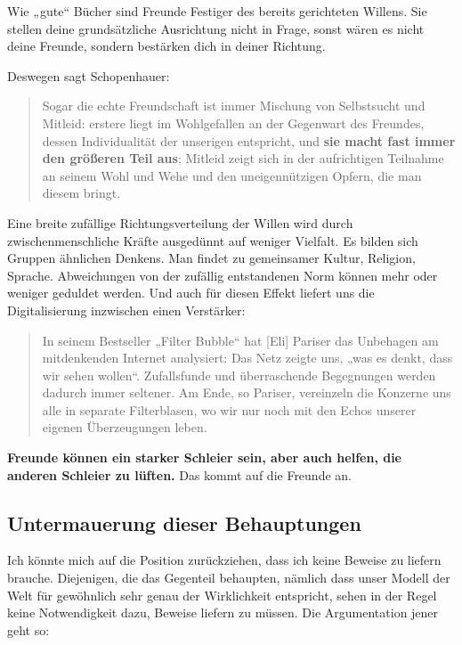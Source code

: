 \documentclass[12pt]{book}
\begin{document}
Wie „gute“ Bücher sind Freunde Festiger des bereits gerichteten Willens. Sie stellen deine grundsätzliche Ausrichtung nicht in Frage, sonst wären es nicht deine Freunde, sondern bestärken dich in deiner Richtung. 

Deswegen sagt Schopenhauer:

\begin{quote}\begin{tcolorbox}
Sogar die echte Freundschaft ist immer Mischung von Selbstsucht und Mitleid: erstere liegt im Wohlgefallen an der Gegenwart des Freundes, dessen Individualität der unserigen entspricht, und \textbf{sie macht fast immer den größeren Teil aus}; Mitleid zeigt sich in der aufrichtigen Teilnahme an seinem Wohl und Wehe und den uneigennützigen Opfern, die man diesem bringt.
\end{tcolorbox}\end{quote}

Eine breite zufällige Richtungsverteilung der Willen wird durch zwischenmenschliche Kräfte ausgedünnt auf weniger Vielfalt. Es bilden sich Gruppen ähnlichen Denkens. Man findet zu gemeinsamer Kultur, Religion, Sprache. Abweichungen von der zufällig entstandenen Norm können mehr oder weniger geduldet werden.
Und auch für diesen Effekt liefert uns die Digitalisierung inzwischen einen Verstärker:

\begin{quote}\begin{tcolorbox}
In seinem Bestseller „Filter Bubble“ hat [Eli] Pariser das Unbehagen am mitdenkenden Internet analysiert: Das Netz zeigte uns, „was es denkt, dass wir sehen wollen“. Zufallsfunde und überraschende Begegnungen werden dadurch immer seltener. Am Ende, so Pariser, vereinzeln die Konzerne uns alle in separate Filterblasen, wo wir nur noch mit den Echos unserer eigenen Überzeugungen leben.
\end{tcolorbox}\end{quote}

\textbf{Freunde können ein starker Schleier sein, aber auch helfen, die anderen Schleier zu lüften.} Das kommt auf die Freunde an.

\subsection{Untermauerung dieser Behauptungen}

Ich könnte mich auf die Position zurückziehen, dass ich keine Beweise zu liefern brauche. Diejenigen, die das Gegenteil behaupten, nämlich dass unser Modell der Welt für gewöhnlich sehr genau der Wirklichkeit entspricht, sehen in der Regel keine Notwendigkeit dazu, Beweise liefern zu müssen. Die Argumentation jener geht so:
\end{document}
